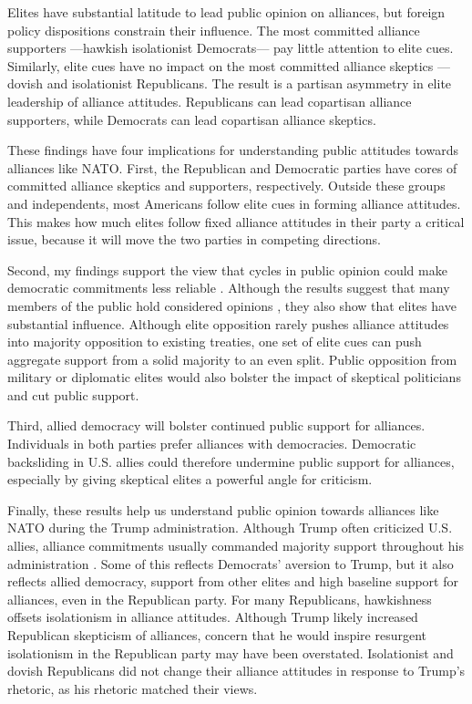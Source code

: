 \documentclass[12pt]{article}
\begin{document}
Elites have substantial latitude to lead public opinion on alliances, but foreign policy dispositions constrain their influence. 
The most committed alliance supporters ---hawkish isolationist Democrats--- pay little attention to elite cues.
Similarly, elite cues have no impact on the most committed alliance skeptics --- dovish and isolationist Republicans. 
The result is a partisan asymmetry in elite leadership of alliance attitudes. 
Republicans can lead copartisan alliance supporters, while Democrats can lead copartisan alliance skeptics. 


These findings have four implications for understanding public attitudes towards alliances like NATO. 
First, the Republican and Democratic parties have cores of committed alliance skeptics and supporters, respectively.
Outside these groups and independents, most Americans follow elite cues in forming alliance attitudes. 
This makes how much elites follow fixed alliance attitudes in their party a critical issue, because it will move the two parties in competing directions.  


Second, my findings support the view that cycles in public opinion could make democratic commitments less reliable \citep{GartzkeGleditsch2004}. 
Although the results suggest that many members of the public hold considered opinions \citep{PageShapiro1992}, they also show that elites have substantial influence. 
Although elite opposition rarely pushes alliance attitudes into majority opposition to existing treaties, one set of elite cues can push aggregate support from a solid majority to an even split.
Public opposition from military or diplomatic elites would also bolster the impact of skeptical politicians and cut public support. 


Third, allied democracy will bolster continued public support for alliances.
Individuals in both parties prefer alliances with democracies. 
Democratic backsliding in U.S. allies could therefore undermine public support for alliances, especially by giving skeptical elites a powerful angle for criticism. 


Finally, these results help us understand public opinion towards alliances like NATO during the Trump administration.
Although Trump often criticized U.S. allies, alliance commitments usually commanded majority support throughout his administration \citep{PewNATO2020}. 
Some of this reflects Democrats' aversion to Trump, but it also reflects allied democracy, support from other elites and high baseline support for alliances, even in the Republican party.  
For many Republicans, hawkishness offsets isolationism in alliance attitudes.
Although Trump likely increased Republican skepticism of alliances, concern that he would inspire resurgent isolationism in the Republican party may have been overstated.
Isolationist and dovish Republicans did not change their alliance attitudes in response to Trump's rhetoric, as his rhetoric matched their views. 
\end{document}
